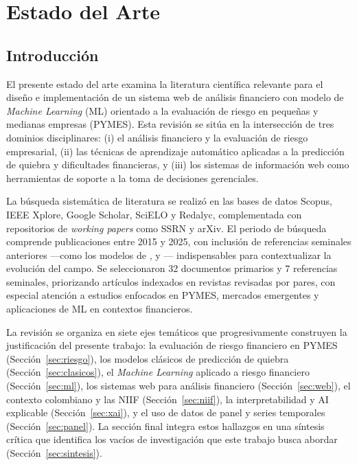 \documentclass[12pt, letterpaper]{article}
\begin{document}
\section{Estado del Arte}

\subsection{Introducci\'on}

El presente estado del arte examina la literatura cient\'ifica relevante para el dise\~no e implementaci\'on de un sistema web de an\'alisis financiero con modelo de \textit{Machine Learning} (ML) orientado a la evaluaci\'on de riesgo en peque\~nas y medianas empresas (PYMES). Esta revisi\'on se sit\'ua en la intersecci\'on de tres dominios disciplinares: (i) el an\'alisis financiero y la evaluaci\'on de riesgo empresarial, (ii) las t\'ecnicas de aprendizaje autom\'atico aplicadas a la predicci\'on de quiebra y dificultades financieras, y (iii) los sistemas de informaci\'on web como herramientas de soporte a la toma de decisiones gerenciales.

La b\'usqueda sistem\'atica de literatura se realiz\'o en las bases de datos Scopus, IEEE Xplore, Google Scholar, SciELO y Redalyc, complementada con repositorios de \textit{working papers} como SSRN y arXiv. El periodo de b\'usqueda comprende publicaciones entre 2015 y 2025, con inclusi\'on de referencias seminales anteriores ---como los modelos de \citet{Altman1968}, \citet{Ohlson1980} y \citet{Zmijewski1984}--- indispensables para contextualizar la evoluci\'on del campo. Se seleccionaron 32 documentos primarios y 7 referencias seminales, priorizando art\'iculos indexados en revistas revisadas por pares, con especial atenci\'on a estudios enfocados en PYMES, mercados emergentes y aplicaciones de ML en contextos financieros.

La revisi\'on se organiza en siete ejes tem\'aticos que progresivamente construyen la justificaci\'on del presente trabajo: la evaluaci\'on de riesgo financiero en PYMES (Secci\'on~\ref{sec:riesgo}), los modelos cl\'asicos de predicci\'on de quiebra (Secci\'on~\ref{sec:clasicos}), el \textit{Machine Learning} aplicado a riesgo financiero (Secci\'on~\ref{sec:ml}), los sistemas web para an\'alisis financiero (Secci\'on~\ref{sec:web}), el contexto colombiano y las NIIF (Secci\'on~\ref{sec:niif}), la interpretabilidad y AI explicable (Secci\'on~\ref{sec:xai}), y el uso de datos de panel y series temporales (Secci\'on~\ref{sec:panel}). La secci\'on final integra estos hallazgos en una s\'intesis cr\'itica que identifica los vac\'ios de investigaci\'on que este trabajo busca abordar (Secci\'on~\ref{sec:sintesis}).
\end{document}
